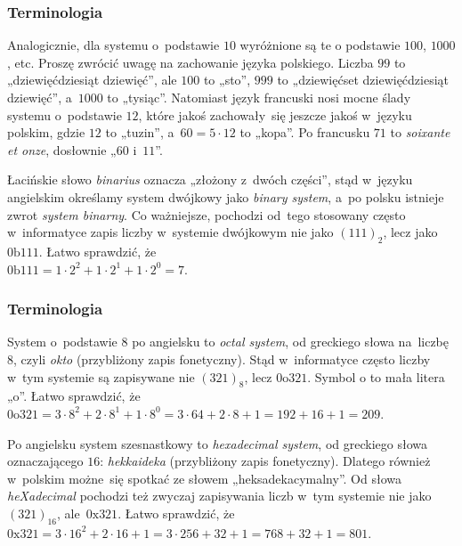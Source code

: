 \documentclass[10pt,t]{beamer}
\begin{document}
\begin{frame}
  \frametitle{Terminologia}


  Analogicznie, dla systemu o~podstawie $10$ wyróżnione są te o podstawie
  $100$, $1000$, etc. Proszę zwrócić uwagę na zachowanie języka polskiego.
  Liczba $99$ to „dziewięćdziesiąt dziewięć”, ale $100$ to „sto”,
  $999$ to „dziewięćset dziewięćdziesiąt dziewięć”, a~$1000$ to „tysiąc”.
  Natomiast język francuski nosi mocne ślady systemu o~podstawie $12$, które
  jakoś zachowały~się jeszcze jakoś w~języku polskim, gdzie $12$ to „tuzin”,
  a~$60 = 5 \cdot 12$ to „kopa”. Po francusku $71$ to \textit{soixante et onze},
  dosłownie „$60$ i~$11$”.

  Łacińskie słowo \textit{binarius} oznacza „złożony z~dwóch części”, stąd
  w~języku angielskim określamy system dwójkowy jako \textit{binary system},
  a~po polsku istnieje zwrot \textit{system binarny}. Co ważniejsze,
  pochodzi od~tego stosowany często w~informatyce zapis liczby w~systemie
  dwójkowym nie jako $(111)_{ 2 }$, lecz jako $0\text{b}111$. Łatwo
  sprawdzić, że \\
  $\displaystyle
  0\text{b}111 = 1 \cdot 2^{ 2 } + 1 \cdot 2^{ 1 } + 1 \cdot 2^{ 0 } = 7.$

\end{frame}





\begin{frame}
  \frametitle{Terminologia}


  System o~podstawie $8$ po angielsku to \textit{octal system}, od
  greckiego słowa na~liczbę $8$, czyli \textit{okto} (przybliżony zapis
  fonetyczny). Stąd w~informatyce często liczby w~tym systemie są
  zapisywane nie $(321)_{ 8 }$, lecz $0\text{o}321$. Symbol $\text{o}$ to
  mała litera „o”. Łatwo sprawdzić, że \\
  $\displaystyle
  0\text{o}321 = 3 \cdot 8^{ 2 } + 2 \cdot 8^{ 1 } + 1 \cdot 8^{ 0 } =
  3 \cdot 64 + 2 \cdot 8 + 1 = 192 + 16 + 1 = 209.$

  Po angielsku system szesnastkowy to \textit{hexadecimal system}, od
  greckiego słowa oznaczającego $16$: \textit{hekkaideka} (przybliżony
  zapis fonetyczny). Dlatego również w~polskim możne~się spotkać
  ze słowem „heksadekacymalny”. Od słowa \textit{heXadecimal} pochodzi też
  zwyczaj zapisywania liczb w~tym systemie nie jako $(321)_{ 16 }$,
  ale~$0\text{x}321$. Łatwo sprawdzić, że \\
  $0\text{x}321 = 3 \cdot 16^{ 2 } + 2 \cdot 16 + 1 = 3 \cdot  256 + 32 + 1 =
  768 + 32 + 1 = 801.$

\end{frame}
\end{document}
